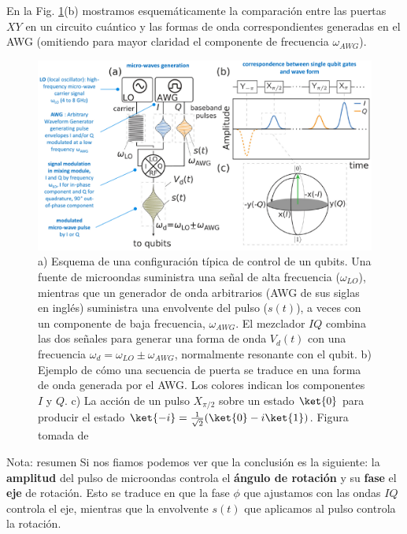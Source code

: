         En la Fig. \ref{Fig_scq_pulsos_1_2}(b) mostramos esquemáticamente la comparación entre las puertas $XY$ en un circuito cuántico y las formas de onda correspondientes generadas en el AWG (omitiendo para mayor claridad el componente de frecuencia $\omega_{AWG}$).


        \begin{figure}[h]
        	\centering 
        	\includegraphics[width=1\linewidth]{Figuras/Fig_scq_pulsos_1.png}
        	\caption{a) Esquema de una configuración típica de control de un qubits. Una fuente de microondas suministra una señal de alta frecuencia ($\omega_{LO}$), mientras que un generador de onda arbitrarios (AWG de sus siglas en inglés) suministra una envolvente del pulso ($s(t)$), a veces con un componente de baja frecuencia, $\omega_{AWG}$. El mezclador $IQ$ combina las dos señales para generar una forma de onda $V_d(t)$ con una frecuencia $\omega_d = \omega_{LO} \pm \omega_{AWG}$, normalmente resonante con el qubit. b) Ejemplo de cómo una secuencia de puerta se traduce en una forma de onda generada por el AWG. Los colores indican los componentes $I$ y $Q$. c) La acción de un pulso $X_{\pi/2}$ sobre un estado $\ket{0}$ para producir el estado $\ket{-i} = \frac{1}{\sqrt{2}} (\ket{0} - i\ket{1})$. Figura tomada de \cite{bib_scq_ezratty2023perspective}}
        	\label{Fig_scq_pulsos_1_2}
    	\end{figure}


    \begin{mybox_blue}{Nota: resumen}
         Si nos fiamos podemos ver que la conclusión es la siguiente: la \textbf{amplitud} del pulso de microondas controla el \textbf{ángulo de rotación} y su \textbf{fase} el \textbf{eje} de rotación. Esto se traduce en que la fase $\phi$ que ajustamos con las ondas $IQ$ controla el eje, mientras que la envolvente $s(t)$ que aplicamos al pulso controla la rotación.
    \end{mybox_blue}


